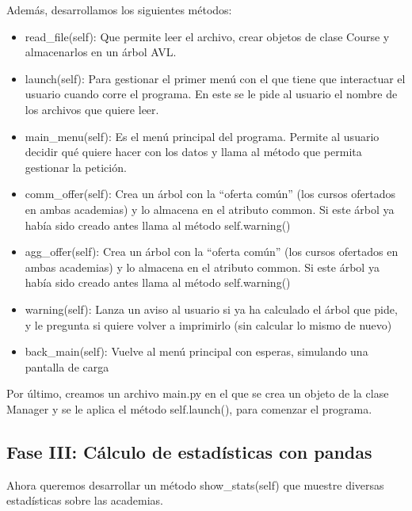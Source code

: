 \documentclass[a4paper]{article}
\begin{document}
Además, desarrollamos los siguientes métodos:
\begin{itemize}

\item{read\_file(self): Que permite leer el archivo, crear objetos de clase Course y almacenarlos en un árbol AVL.}

\item{launch(self): Para gestionar el primer menú con el que tiene que interactuar el usuario cuando corre el programa. En este se le pide al usuario el nombre de los archivos que quiere leer.}

\item{main\_menu(self): Es el menú principal del programa. Permite al usuario decidir qué quiere hacer con los datos y llama al método que permita gestionar la petición.}

\item{comm\_offer(self): Crea un árbol con la ``oferta común'' (los cursos ofertados en ambas academias) y lo almacena en el atributo common. Si este árbol ya había sido creado antes llama al método self.warning()}

\item{agg\_offer(self): Crea un árbol con la ``oferta común'' (los cursos ofertados en ambas academias) y lo almacena en el atributo common. Si este árbol ya había sido creado antes llama al método self.warning()}

\item{warning(self): Lanza un aviso al usuario si ya ha calculado el árbol que pide, y le pregunta si quiere volver a imprimirlo (sin calcular lo mismo de nuevo)}

\item{back\_main(self): Vuelve al menú principal con esperas, simulando una pantalla de carga}

\end{itemize}

Por último, creamos un archivo main.py en el que se crea un objeto de la clase Manager y se le aplica el método self.launch(), para comenzar el programa.

\newpage

\subsection{Fase III: Cálculo de estadísticas con pandas}

Ahora queremos desarrollar un método show\_stats(self) que muestre diversas estadísticas sobre las academias.
\end{document}
